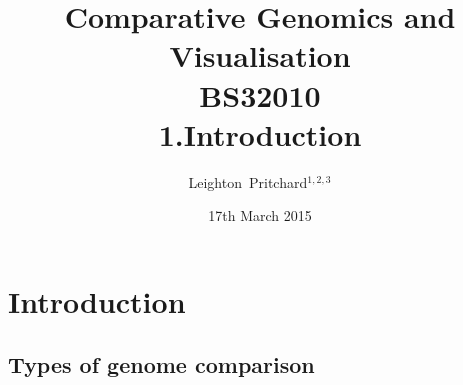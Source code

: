 

%



\title[Comparative Genomics and Visualisation: 1.Introduction] %
{Comparative Genomics and \\ Visualisation \\
BS32010 \\
1.Introduction}
\author[Pritchard] %
{Leighton~Pritchard$^{1,2,3}$}
\date[17th March 2015] %
{17th March 2015}
\subject{Bioinformatics, Genomics, Bacteria, Sequencing, Microbiology, Microbes, Comparative Genomics, Visualisation}





\frame[plain]{\titlepage}



\section{Introduction}


\subsection{Types of genome comparison}







